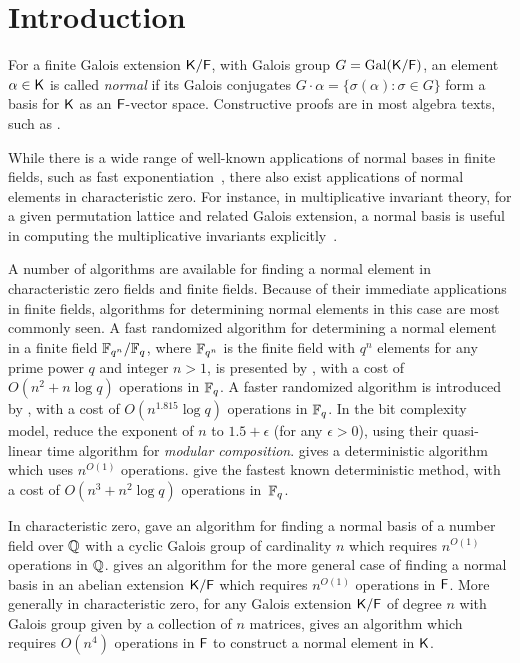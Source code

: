 \section{Introduction}

For a finite Galois extension ${\mathsf{K}}/{\mathsf{F}}$, with Galois group $G =
\mathrm{Gal}({\mathsf{K}}/{\mathsf{F}})$, an element $\alpha \in {\mathsf{K}}$ is called
\emph{normal} if its Galois conjugates $G \cdot \alpha = \{
\sigma(\alpha): \sigma\in G\}$ form a basis for ${\mathsf{K}}$ as an ${\mathsf{F}}$-vector
space. Constructive proofs are in most algebra texts, such as
\cite[\S6.13]{Lang}.

 
While there is a wide range of well-known applications of normal bases in
finite fields, such as fast exponentiation~\cite{GaGaPaSh00}, there also
exist applications of normal elements in characteristic zero.  For instance,
in multiplicative invariant theory, for a given permutation lattice and
related Galois extension, a normal basis is useful in computing the
multiplicative invariants explicitly~\cite{Jam18}.

A number of algorithms are available for finding a normal element in
characteristic zero fields and finite fields.  Because of their immediate
applications in finite fields, algorithms for determining normal elements
in this case are most commonly seen.  A fast randomized algorithm for
determining a normal element in a finite field ${\mathbb{F}}_{q^n}/{\mathbb{F}}_q$, where
${\mathbb{F}}_{q^n}$ is the finite field with $q^n$ elements for any prime power $q$
and integer $n>1$, is presented by , with a cost of
$O(n^2+n\log q)$ operations in ${\mathbb{F}}_q$.  A faster randomized algorithm is
introduced by , with a cost of $O(n^{1.815}\log q)$
operations in ${\mathbb{F}}_q$.  In the bit complexity model, \citet{KeUm11} 
reduce the exponent of $n$ to $1.5+\epsilon$ (for any
$\epsilon > 0$), using their quasi-linear time algorithm for
{\em modular composition}.  gives a
deterministic algorithm which uses $n^{O(1)}$
operations.   give the fastest known deterministic method,
with a cost of $O(n^3+n^2\log q)$ operations in~${\mathbb{F}}_q$.

In characteristic zero,  gave an algorithm for finding
a normal basis of a number field over $\mathbb{Q}$ with a cyclic Galois group
of cardinality $n$ which requires $n^{O(1)}$ operations in $\mathbb{Q}$.
 gives an algorithm for the more general case of finding
a normal basis in an abelian extension ${\mathsf{K}}/{\mathsf{F}}$ which requires
$n^{O(1)}$ operations in ${\mathsf{F}}$.  More generally in characteristic zero, for any
Galois extension ${\mathsf{K}}/{\mathsf{F}}$ of degree $n$ with Galois group given by a
collection of $n$ matrices,  gives an algorithm which
requires $O(n^4)$ operations in ${\mathsf{F}}$ to construct a normal element in
${\mathsf{K}}$.

